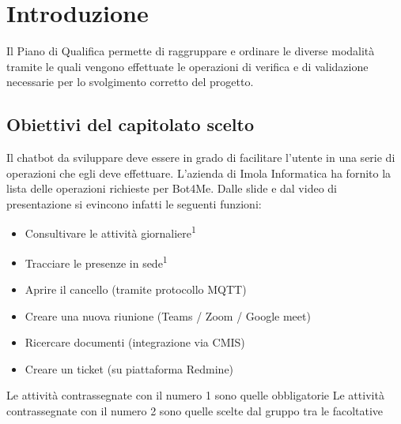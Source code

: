\section{Introduzione}
    Il Piano di Qualifica permette di raggruppare e ordinare le diverse modalità tramite le quali vengono effettuate le operazioni di verifica e di validazione necessarie per lo svolgimento corretto del progetto.
	\subsection{Obiettivi del capitolato scelto}
	    Il chatbot da sviluppare deve essere in grado di facilitare l'utente in una serie di operazioni che egli deve effettuare. \newline
	    L'azienda di Imola Informatica ha fornito la lista delle operazioni richieste per Bot4Me. Dalle slide e dal video di presentazione si evincono infatti le seguenti funzioni:
	    \begin{itemize}
	        \item Consultivare le attività giornaliere\textsuperscript{1}
	        \item Tracciare le presenze in sede\textsuperscript{1}
	        \item Aprire il cancello (tramite protocollo MQTT)
	        \item Creare una nuova riunione (Teams / Zoom / Google meet)
	        \item Ricercare documenti (integrazione via CMIS)
	        \item Creare un ticket (su piattaforma Redmine)
	    \end{itemize}
	    Le attività contrassegnate con il numero 1 sono quelle obbligatorie \newline
	    Le attività contrassegnate con il numero 2 sono quelle scelte dal gruppo tra le facoltative
	\newpage